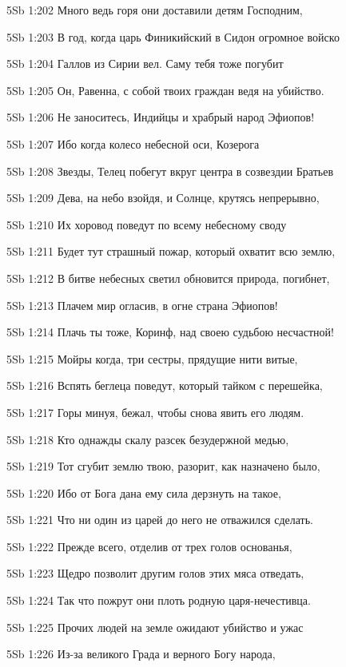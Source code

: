 \vs 5Sb 1:202 Много ведь горя они доставили детям Господним, 

\vs 5Sb 1:203 В год, когда царь Финикийский в Сидон огромное войско 

\vs 5Sb 1:204 Галлов из Сирии вел. Саму тебя тоже погубит

\vs 5Sb 1:205 Он, Равенна, с собой твоих граждан ведя на убийство.

\vs 5Sb 1:206 Не заноситесь, Индийцы и храбрый народ Эфиопов! 

\vs 5Sb 1:207 Ибо когда колесо небесной оси, Козерога

\vs 5Sb 1:208 Звезды, Телец побегут вкруг центра в созвездии Братьев  

\vs 5Sb 1:209 Дева, на небо взойдя, и Солнце, крутясь непрерывно, 

\vs 5Sb 1:210 Их хоровод поведут по всему небесному своду 

\vs 5Sb 1:211 Будет тут страшный пожар, который охватит всю землю, 

\vs 5Sb 1:212 В битве небесных светил обновится природа, погибнет, 

\vs 5Sb 1:213 Плачем мир огласив, в огне страна Эфиопов!

\vs 5Sb 1:214 Плачь ты тоже, Коринф, над своею судьбою несчастной!

\vs 5Sb 1:215 Мойры когда, три сестры, прядущие нити витые, 

\vs 5Sb 1:216 Вспять беглеца поведут, который тайком с перешейка, 

\vs 5Sb 1:217 Горы минуя, бежал, чтобы снова явить его людям. 

\vs 5Sb 1:218 Кто однажды скалу разсек безудержной медью, 

\vs 5Sb 1:219 Тот сгубит землю твою, разорит, как назначено было,

\vs 5Sb 1:220 Ибо от Бога дана ему сила дерзнуть на такое,

\vs 5Sb 1:221 Что ни один из царей до него не отважился сделать. 

\vs 5Sb 1:222 Прежде всего, отделив от трех голов основанья, 

\vs 5Sb 1:223 Щедро позволит другим голов этих мяса отведать, 

\vs 5Sb 1:224 Так что пожрут они плоть родную царя-нечестивца.

\vs 5Sb 1:225 Прочих людей на земле ожидают убийство и ужас 

\vs 5Sb 1:226 Из-за великого Града и верного Богу народа, 

